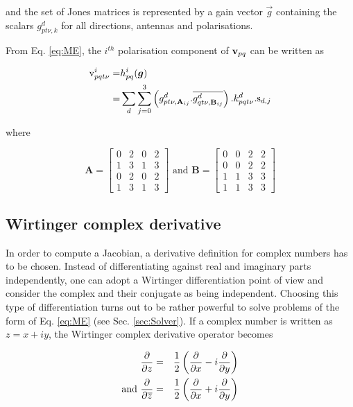 \noindent and the set of Jones matrices is represented by a gain
vector $\vec{g}$ containing the scalars $g^{d}_{pt\nu,k}$ for all
directions, antennas and polarisations.

From Eq. \ref{eq:ME}, the $i^{th}$ polarisation component of $\textbf{v}_{pq}$
can be written as

\begin{alignat}{2}
\label{eq:hpq}
\mathrm{v}^i_{pqt\nu}=&h^i_{pq}(\vec{g})\\
=&
\displaystyle\sum\limits_{d}
\displaystyle\sum\limits_{j=0}^3 \left(g^{d}_{pt\nu,\textbf{A}_{ij}}.\conj{g^{d}_{qt\nu,\textbf{B}_{ij}}}\right).k^{d}_{pqt\nu}.\text{s}_{d,j}
\end{alignat}

\noindent where 

\begin{equation}
\textbf{A}=
\begin{bmatrix}
0 & 2 & 0 & 2 \\ 
1 & 3 & 1 & 3 \\ 
0 & 2 & 0 & 2 \\
1 & 3 & 1 & 3 
\end{bmatrix}
\text{ and }
\textbf{B}=
\begin{bmatrix}
0 & 0 & 2 & 2 \\ 
0 & 0 & 2 & 2 \\ 
1 & 1 & 3 & 3 \\
1 & 1 & 3 & 3 
\end{bmatrix}
\end{equation}



\subsection{Wirtinger complex derivative}
\label{sec:Cderiv}

In order to compute a Jacobian, a
derivative definition for complex numbers has to be chosen. Instead of
differentiating against real and imaginary parts independently, one can
adopt a Wirtinger differentiation point of view and consider the
complex and their conjugate as being independent. Choosing this type of differentiation
turns out to be rather powerful to solve problems of the form of
Eq. \ref{eq:ME} (see
Sec. \ref{sec:Solver}). If a complex number is written as $z=x+iy$, the
Wirtinger complex derivative operator becomes


\begin{alignat}{3}
\frac{\partial }{\partial z}&=&\frac{1}{2}\left(\frac{\partial }{\partial x}-i\frac{\partial }{\partial y}\right)\\
\text{and }\frac{\partial }{\partial \overline{z}}&=&\frac{1}{2}\left(\frac{\partial }{\partial x}+i\frac{\partial }{\partial y}\right)
\end{alignat}


